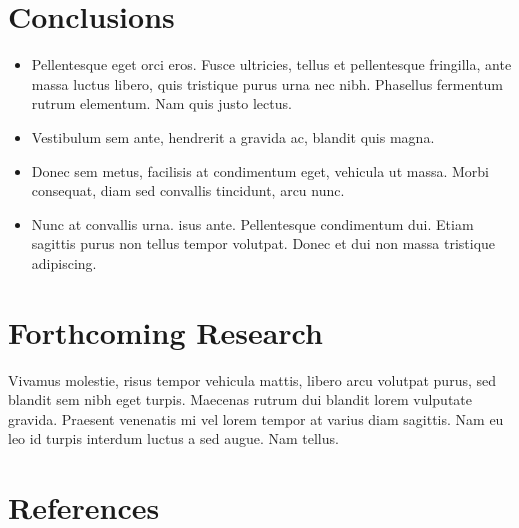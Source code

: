 \documentclass[a0,portrait]{a0poster}
\begin{document}
\begin{multicols}{2}
\color{SaddleBrown} %

\section*{Conclusions}

\begin{itemize}

\item Pellentesque eget orci eros. Fusce ultricies, tellus et pellentesque
    fringilla, ante massa luctus libero, quis tristique purus urna nec
    nibh. Phasellus fermentum rutrum elementum. Nam quis justo lectus.
\item Vestibulum sem ante, hendrerit a gravida ac, blandit quis magna.
\item Donec sem metus, facilisis at condimentum eget, vehicula ut massa.
    Morbi consequat, diam sed convallis tincidunt, arcu nunc.
\item Nunc at convallis urna. isus ante. Pellentesque condimentum dui.
    Etiam sagittis purus non tellus tempor volutpat. Donec et dui non
    massa tristique adipiscing.
\end{itemize}

\color{DarkSlateGray} %


\section*{Forthcoming Research}

Vivamus molestie, risus tempor vehicula mattis, libero arcu volutpat
purus, sed blandit sem nibh eget turpis. Maecenas rutrum dui blandit lorem
vulputate gravida. Praesent venenatis mi vel lorem tempor at varius diam
sagittis. Nam eu leo id turpis interdum luctus a sed augue. Nam tellus.

\section*{References}


\end{multicols}
\end{document}
